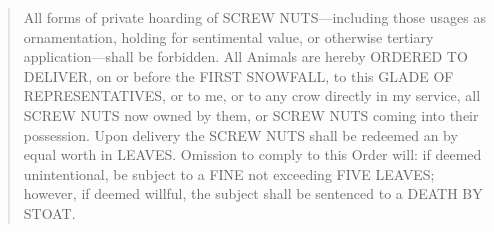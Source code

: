 \begingroup
	\fontsize{10pt}{12pt}\selectfont
		\begin{quote}
			All forms of private hoarding of SCREW NUTS---including those usages as ornamentation, holding for sentimental value, or otherwise tertiary application---shall be forbidden. All Animals are hereby ORDERED TO DELIVER, on or before the FIRST SNOWFALL, to this GLADE OF REPRESENTATIVES, or to me, or to any crow directly in my service, all SCREW NUTS now owned by them, or SCREW NUTS coming into their possession. Upon delivery the SCREW NUTS shall be redeemed an by equal worth in LEAVES. Omission to comply to this Order will: if deemed unintentional, be subject to a FINE not exceeding FIVE LEAVES; however, if deemed willful, the subject shall be sentenced to a DEATH BY STOAT.
		\end{quote}
\endgroup